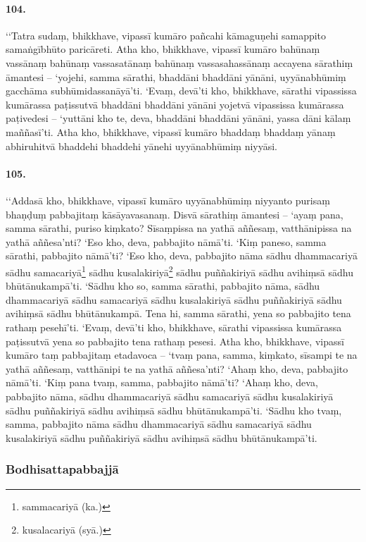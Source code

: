 \paragraph{104.} ‘‘Tatra sudaṃ, bhikkhave, vipassī kumāro pañcahi kāmaguṇehi samappito samaṅgībhūto paricāreti. Atha kho, bhikkhave, vipassī kumāro bahūnaṃ vassānaṃ bahūnaṃ vassasatānaṃ bahūnaṃ vassasahassānaṃ accayena sārathiṃ āmantesi – ‘yojehi, samma sārathi, bhaddāni bhaddāni yānāni, uyyānabhūmiṃ gacchāma subhūmidassanāyā’ti. ‘Evaṃ, devā’ti kho, bhikkhave, sārathi vipassissa kumārassa paṭissutvā bhaddāni bhaddāni yānāni yojetvā vipassissa kumārassa paṭivedesi – ‘yuttāni kho te, deva, bhaddāni bhaddāni yānāni, yassa dāni kālaṃ maññasī’ti. Atha kho, bhikkhave, vipassī kumāro bhaddaṃ bhaddaṃ yānaṃ abhiruhitvā bhaddehi bhaddehi yānehi uyyānabhūmiṃ niyyāsi.

\paragraph{105.} ‘‘Addasā kho, bhikkhave, vipassī kumāro uyyānabhūmiṃ niyyanto purisaṃ bhaṇḍuṃ pabbajitaṃ kāsāyavasanaṃ. Disvā sārathiṃ āmantesi – ‘ayaṃ pana, samma sārathi, puriso kiṃkato? Sīsaṃpissa na yathā aññesaṃ, vatthānipissa na yathā aññesa’nti? ‘Eso kho, deva, pabbajito nāmā’ti. ‘Kiṃ paneso, samma sārathi, pabbajito nāmā’ti? ‘Eso kho, deva, pabbajito nāma sādhu dhammacariyā sādhu samacariyā\footnote{sammacariyā (ka.)} sādhu kusalakiriyā\footnote{kusalacariyā (syā.)} sādhu puññakiriyā sādhu avihiṃsā sādhu bhūtānukampā’ti. ‘Sādhu kho so, samma sārathi, pabbajito nāma, sādhu dhammacariyā sādhu samacariyā sādhu kusalakiriyā sādhu puññakiriyā sādhu avihiṃsā sādhu bhūtānukampā. Tena hi, samma sārathi, yena so pabbajito tena rathaṃ pesehī’ti. ‘Evaṃ, devā’ti kho, bhikkhave, sārathi vipassissa kumārassa paṭissutvā yena so pabbajito tena rathaṃ pesesi. Atha kho, bhikkhave, vipassī kumāro taṃ pabbajitaṃ etadavoca – ‘tvaṃ pana, samma, kiṃkato, sīsampi te na yathā aññesaṃ, vatthānipi te na yathā aññesa’nti? ‘Ahaṃ kho, deva, pabbajito nāmā’ti. ‘Kiṃ pana tvaṃ, samma, pabbajito nāmā’ti? ‘Ahaṃ kho, deva, pabbajito nāma, sādhu dhammacariyā sādhu samacariyā sādhu kusalakiriyā sādhu puññakiriyā sādhu avihiṃsā sādhu bhūtānukampā’ti. ‘Sādhu kho tvaṃ, samma, pabbajito nāma sādhu dhammacariyā sādhu samacariyā sādhu kusalakiriyā sādhu puññakiriyā sādhu avihiṃsā sādhu bhūtānukampā’ti.

\subsubsection{Bodhisattapabbajjā}

